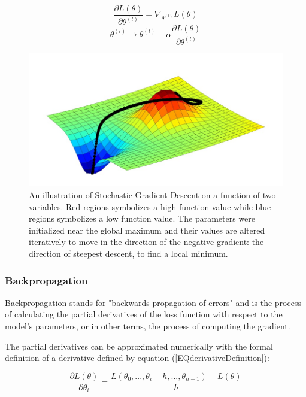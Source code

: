\documentclass[a4paper,11pt,twoside]{article}
\newcommand*{\pd}[2]{\ensuremath{\dfrac{\partial #1}{\partial #2}}}
\begin{document}
\begin{equation}\label{EQgradient}
\pd{L(\theta)}{\theta^{(l)}} = \nabla_{\theta^{(l)}} L(\theta)
\end{equation}
\begin{equation}\label{SGD}
\theta^{(l)} \to \theta^{(l)} - \alpha \pd{L(\theta)}{\theta^{(l)}}
\end{equation}
\begin{figure}[h]
	\centering
  		\includegraphics[scale=0.5]{SGD.png}
  	\caption{An illustration of Stochastic Gradient Descent on a function of two variables. Red regions symbolizes a high function value while blue regions symbolizes a low function value. The parameters were initialized near the global maximum and their values are altered iteratively to move in the direction of the negative gradient: the direction of steepest descent, to find a local minimum. \cite{figSGD}} \label{figSGD}
\end{figure}

\subsubsection{Backpropagation}
Backpropagation stands for "backwards propagation of errors" and is the process of calculating the partial derivatives of the loss function with respect to the model's parameters, or in other terms, the process of computing the gradient. \cite{wikiStanford} \cite{gradient}

The partial derivatives can be approximated numerically with the formal definition of a derivative defined by equation (\ref{EQderivativeDefinition}): \cite{wikiStanford} \cite{gradient}

\begin{equation}\label{EQderivativeDefinition}
\pd{L(\theta)}{\theta_{i}} = \frac{L(\theta_{0},...,\theta_{i} + h, ..., \theta_{n-1})-L(\theta)}{h}
\end{equation}
\end{document}
